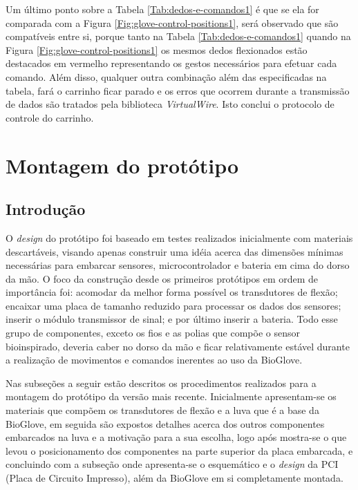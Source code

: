 \documentclass[
	12pt,				%
	openright,			%
	oneside,			%
	a4paper,			%
	english,			%
	brazil				%
	]{abntex2}
\begin{document}
		Um último ponto sobre a Tabela \ref{Tab:dedos-e-comandos1} é que se ela for comparada com a Figura \ref{Fig:glove-control-positions1}, será observado que são compatíveis entre si, porque tanto na Tabela \ref{Tab:dedos-e-comandos1} quando na Figura \ref{Fig:glove-control-positions1} os mesmos dedos flexionados estão destacados em vermelho representando os gestos necessários para efetuar cada comando. Além disso, qualquer outra combinação além das especificadas na tabela, fará o carrinho ficar parado e os erros que ocorrem durante a transmissão de dados são tratados pela biblioteca \textit{VirtualWire}. Isto conclui o protocolo de controle do carrinho.



		\section{Montagem do protótipo}

		
				\subsection{Introdução}	
				

		O \textit{design} do protótipo foi baseado em testes realizados inicialmente com materiais descartáveis, visando apenas construir uma idéia acerca das dimensões mínimas necessárias para embarcar sensores, microcontrolador e bateria em cima do dorso da mão. O foco da construção desde os primeiros protótipos em ordem de importância foi: acomodar da melhor forma possível os transdutores de flexão; encaixar uma placa de tamanho reduzido para processar os dados dos sensores; inserir o módulo transmissor de sinal; e por último inserir a bateria. Todo esse grupo de componentes, exceto os fios e as polias que compõe o sensor bioinspirado, deveria caber no dorso da mão e ficar relativamente estável durante a realização de movimentos e comandos inerentes ao uso da BioGlove.

		Nas subseções a seguir estão descritos os procedimentos realizados para a montagem do protótipo da versão mais recente. Inicialmente apresentam-se os materiais que compõem os transdutores de flexão e a luva que é a base da BioGlove, em seguida são expostos detalhes acerca dos outros componentes embarcados na luva e a motivação para a sua escolha, logo após mostra-se o que levou o posicionamento dos componentes na parte superior da placa embarcada, e concluindo com a subseção onde apresenta-se o esquemático e o \textit{design} da PCI (Placa de Circuito Impresso), além da BioGlove em si completamente montada.
\end{document}
